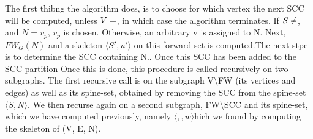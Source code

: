 \documentclass[../master.tex]{subfiles}
\newcommand{\FW}[2][G]{\ensuremath{FW_{#1}(#2)}}
\newcommand{\pair}[2]{\ensuremath{\langle #1, #2\rangle}}
\begin{document}
The first thibng the algorithm does, is to choose for which vertex the next SCC will be computed, unless $V=\empty$, in which case the algorithm terminates. If $S\neq\empty$, and $N={v_p}$, $v_p$ is chosen. Otherwise, an arbitrary v is assigned to N. Next, \FW{N} and a skeleton \pair{S'}{u'} on this forward-set is computed.The next stpe is to determine the SCC containing N.. Once this SCC has been added to the SCC partition 
Once this is done, this procedure is called recursively on two subgraphs. The first recursive call is on the subgraph V\textbackslash FW (its vertices and edges) as well as its spine-set, obtained by removing the SCC from the spine-set $\langle S, N\rangle$. We then recurse again on a second subgraph, FW\textbackslash SCC and its spine-set, which we have computed previously, namely \pair, which we found by computing the skeleton of (V, E, N).


\end{document}

